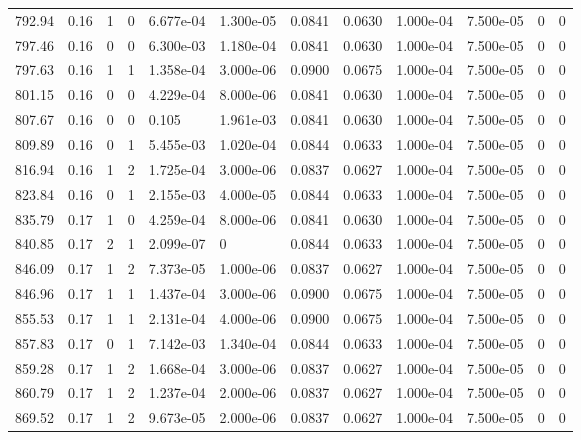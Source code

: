 \documentclass[preview]{standalone}
\begin{document}
{{{\begin{tabular}{L{1.2cm}C{1.2cm} C{0.3cm}C{0.5cm} C{1.4cm}C{1.4cm} C{1.4cm}C{1.4cm} C{1.6cm}C{1.6cm} C{1.6cm}C{1.6cm}}
  792.94  &  0.16  & 1     &  0 &  6.677e-04  & 1.300e-05  &  0.0841&   0.0630& 1.000e-04 & 7.500e-05   &  0 & 0  \\ 
  797.46  &  0.16  & 0     &  0 &  6.300e-03  & 1.180e-04  &  0.0841&   0.0630& 1.000e-04 & 7.500e-05   &  0 & 0  \\ 
  797.63  &  0.16  & 1     &  1 &  1.358e-04  & 3.000e-06  &  0.0900&   0.0675& 1.000e-04 & 7.500e-05   &  0 & 0  \\ 
  801.15  &  0.16  & 0     &  0 &  4.229e-04  & 8.000e-06  &  0.0841&   0.0630& 1.000e-04 & 7.500e-05   &  0 & 0  \\ 
  807.67  &  0.16  & 0     &  0 &  0.105  & 1.961e-03  &  0.0841&   0.0630& 1.000e-04 & 7.500e-05   &  0 & 0  \\ 
  809.89  &  0.16  & 0     &  1 &  5.455e-03  & 1.020e-04  &  0.0844&   0.0633& 1.000e-04 & 7.500e-05   &  0 & 0  \\ 
  816.94  &  0.16  & 1     &  2 &  1.725e-04  & 3.000e-06  &  0.0837&   0.0627& 1.000e-04 & 7.500e-05   &  0 & 0  \\ 
  823.84  &  0.16  & 0     &  1 &  2.155e-03  & 4.000e-05  &  0.0844&   0.0633& 1.000e-04 & 7.500e-05   &  0 & 0  \\ 
  835.79  &  0.17  & 1     &  0 &  4.259e-04  & 8.000e-06  &  0.0841&   0.0630& 1.000e-04 & 7.500e-05   &  0 & 0  \\ 
  840.85  &  0.17  & 2     &  1 &  2.099e-07  & 0  &  0.0844&   0.0633& 1.000e-04 & 7.500e-05   &  0 & 0  \\ 
  846.09  &  0.17  & 1     &  2 &  7.373e-05  & 1.000e-06  &  0.0837&   0.0627& 1.000e-04 & 7.500e-05   &  0 & 0  \\ 
  846.96  &  0.17  & 1     &  1 &  1.437e-04  & 3.000e-06  &  0.0900&   0.0675& 1.000e-04 & 7.500e-05   &  0 & 0  \\ 
  855.53  &  0.17  & 1     &  1 &  2.131e-04  & 4.000e-06  &  0.0900&   0.0675& 1.000e-04 & 7.500e-05   &  0 & 0  \\ 
  857.83  &  0.17  & 0     &  1 &  7.142e-03  & 1.340e-04  &  0.0844&   0.0633& 1.000e-04 & 7.500e-05   &  0 & 0  \\ 
  859.28  &  0.17  & 1     &  2 &  1.668e-04  & 3.000e-06  &  0.0837&   0.0627& 1.000e-04 & 7.500e-05   &  0 & 0  \\ 
  860.79  &  0.17  & 1     &  2 &  1.237e-04  & 2.000e-06  &  0.0837&   0.0627& 1.000e-04 & 7.500e-05   &  0 & 0  \\ 
  869.52  &  0.17  & 1     &  2 &  9.673e-05  & 2.000e-06  &  0.0837&   0.0627& 1.000e-04 & 7.500e-05   &  0 & 0  \\ 

\end{tabular}}}}
\end{document}
